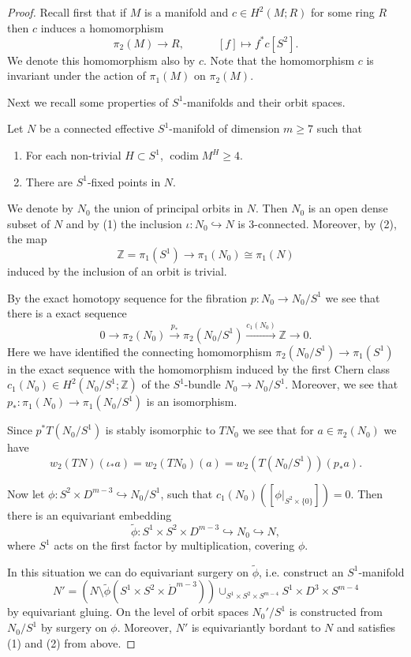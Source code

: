 \documentclass[a4paper, 11pt]{amsart}
\theoremstyle{definition}
\theoremstyle{remark}
\numberwithin{equation}{section}
\DeclareMathOperator{\codim}{codim}
\begin{document}
\begin{proof}
  Recall first that if \(M\) is a manifold and \(c\in H^2(M;R)\) for some ring \(R\) then \(c\) induces a homomorphism
  \[\pi_2(M)\rightarrow R,\quad\quad\quad [f]\mapsto f^*c[S^2].\]
  We denote this homomorphism also by \(c\).
  Note that the homomorphism \(c\) is invariant under the action of \(\pi_1(M)\) on \(\pi_2(M)\).

  Next we recall some properties of \(S^1\)-manifolds and their orbit spaces.

  Let \(N\) be a connected effective \(S^1\)-manifold of dimension \(m\geq 7\) such that
  \begin{enumerate}
  \item For each non-trivial \(H\subset S^1\), \(\codim M^H \geq 4\).
  \item There are \(S^1\)-fixed points in \(N\).
  \end{enumerate}

  We denote by \(N_0\) the union of principal orbits in \(N\).
  Then \(N_0\) is an open dense subset of \(N\) and by (1) the inclusion \(\iota:N_0\hookrightarrow N\) is 3-connected.
  Moreover, by (2), the map
  \[\mathbb{Z}=\pi_1(S^1)\rightarrow \pi_1(N_0)\cong \pi_1(N)\]
  induced by the inclusion of an orbit is trivial.

  By the exact homotopy sequence for the fibration \(p:N_0\rightarrow N_0/S^1\) we see that there is a exact sequence
  \[0\rightarrow \pi_2(N_0)\stackrel{p_*}{\rightarrow} \pi_2(N_0/S^1)\stackrel{c_1(N_0)}{\rightarrow} \mathbb{Z}\rightarrow 0.\]
  Here we have identified the connecting homomorphism \(\pi_2(N_0/S^1)\rightarrow \pi_1(S^1)\) in the exact sequence with the homomorphism induced by the first Chern class \(c_1(N_0)\in H^2(N_0/S^1;\mathbb{Z})\) of the \(S^1\)-bundle \(N_0\rightarrow N_0/S^1\).
  Moreover, we see that \(p_*:\pi_1(N_0)\rightarrow \pi_1(N_0/S^1)\) is an isomorphism.

  Since \(p^*T(N_0/S^1)\) is stably isomorphic to \(TN_0\) we see that for \(a\in \pi_2(N_0)\) we have
  \[w_2(TN)(\iota_*a)=w_2(TN_0)(a)=w_2(T(N_0/S^1))(p_*a).\]

  Now let \(\phi:S^2\times D^{m-3}\hookrightarrow N_0/S^1\), such that \(c_1(N_0)([\phi|_{S^2\times\{0\}}])=0\).
  Then there is an equivariant embedding
  \[\tilde{\phi}:S^1\times S^2\times D^{m-3}\hookrightarrow N_0\hookrightarrow N,\]
  where \(S^1\) acts on the first factor by multiplication, covering \(\phi\).

  In this situation we can do equivariant surgery on \(\tilde{\phi}\), i.e. construct an \(S^1\)-manifold
  \[N'=(N\setminus \tilde{\phi}(S^1\times S^2\times \dot{D}^{m-3}))\cup_{S^1\times S^2\times S^{m-4}} S^1\times D^{3}\times S^{m-4}\]
  by equivariant gluing.
  On the level of orbit spaces \(N_0'/S^1\) is constructed from \(N_0/S^1\) by surgery on \(\phi\).
  Moreover, \(N'\) is equivariantly bordant to \(N\) and satisfies (1) and (2) from above.


\end{proof}
\end{document}
